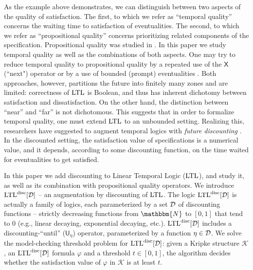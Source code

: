 \documentclass{llncs}
\newcommand{\Nat}{\mathbbm{N}}
\newcommand{\LTL}{{\ensuremath{\rm LTL}}\xspace}
\newcommand{\Next}{\mathsf{X}}
\newcommand{\Until}{\mathsf{U}}
\newcommand{\K}{{\mathcal K}}
\newcommand{\stam}[1]{}
\newcommand{\D}{{\cal D}}
\newcommand{\DLTL}{\ensuremath{\LTL^{\text{disc}}[\D]}}
\begin{document}
As the example above demonstrates, we can distinguish between two 
aspects 
of the quality of satisfaction. The first, to which we refer as ``temporal quality'' concerns the waiting time to satisfaction of eventualities. The second, to which we refer as ``propositional quality'' concerns prioritizing related components of the specification. 
Propositional quality was studied in \cite{ABK13}. In this paper we study temporal quality as well as the combinations of both aspects. One may try to reduce temporal quality to propositional quality by a repeated use of the $\Next$ (``next") operator or by a use of  bounded (prompt) eventualities \cite{AHK10,BC06}. Both approaches, however, partitions the future into finitely many zones and are limited: correctness of $\LTL$ is Boolean, and thus has inherent dichotomy between satisfaction and dissatisfaction. On the other hand, the distinction between ``near'' and ``far'' is not dichotomous.
\stam{
One may try to reduce ``temporal quality'' to ``propositional quality'', using the fact that an eventuality involves a repeated choice between satisfying it in the present or delaying its satisfaction to the strict future. This attempt, however, requires unboundedly many applications of the propositional choice, and is similar to a repeated use of the $\Next$ (``next") operator rather than a use of eventuality operators.
Repeated use of $\Next$ is a limited solution, 
as it partitions the future into finitely many zones, all of which are in the ``near future'', except for a single, unbounded, ``far future''. A more involved approach to distinguish between the ``near'' and ``far'' future  includes bounded (prompt) eventualities \cite{AHK10,BC06}. There, one distinguishes between eventualities whose waiting time is bounded and ones that have no bound.

The weakness of both approaches is not surprising -- correctness of $\LTL$ is Boolean, and thus has inherent dichotomy between satisfaction and dissatisfaction. The distinction between ``near'' and ``far'', however, is not dichotomous.
} This suggests that in order to formalize temporal quality, one must extend $\LTL$ to an unbounded setting. Realizing this, researchers have suggested to augment temporal logics with {\em future discounting} \cite{AHM03}. In the discounted setting, the satisfaction value of specifications is a numerical value, and it depends, according to some discounting function, on the time waited for eventualities to get satisfied.

In this paper we add discounting to Linear Temporal Logic (\LTL), and study it, as well as its combination with propositional quality operators.
We introduce $\DLTL$ -- an augmentation by discounting of \LTL. The logic $\DLTL$ is actually a family of logics, each parameterized by a set $\D$ of discounting functions --  strictly decreasing functions from $\Nat$ to $[0,1]$ that tend to $0$
(e.g., linear decaying, exponential decaying, etc.). $\DLTL$ includes a discounting-``until'' ($\Until_{\eta}$) 
operator, parameterized by a function $\eta \in \D$. We solve the model-checking threshold problem for $\DLTL$: given a Kripke structure $\K$, an $\DLTL$ formula $\varphi$ and a threshold $t\in[0,1]$, the algorithm decides whether the satisfaction value of $\varphi$ in $\K$ is at least $t$.
\end{document}
